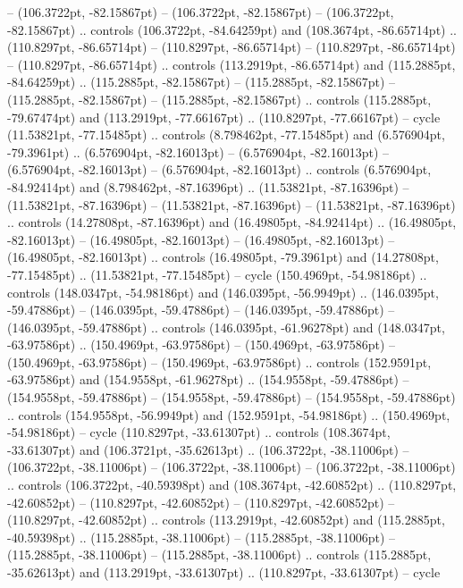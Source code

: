  -- (106.3722pt, -82.15867pt)
 -- (106.3722pt, -82.15867pt)
 -- (106.3722pt, -82.15867pt) .. controls (106.3722pt, -84.64259pt) and (108.3674pt, -86.65714pt) .. (110.8297pt, -86.65714pt)
 -- (110.8297pt, -86.65714pt)
 -- (110.8297pt, -86.65714pt)
 -- (110.8297pt, -86.65714pt) .. controls (113.2919pt, -86.65714pt) and (115.2885pt, -84.64259pt) .. (115.2885pt, -82.15867pt)
 -- (115.2885pt, -82.15867pt)
 -- (115.2885pt, -82.15867pt)
 -- (115.2885pt, -82.15867pt) .. controls (115.2885pt, -79.67474pt) and (113.2919pt, -77.66167pt) .. (110.8297pt, -77.66167pt) -- cycle
(11.53821pt, -77.15485pt) .. controls (8.798462pt, -77.15485pt) and (6.576904pt, -79.3961pt) .. (6.576904pt, -82.16013pt)
 -- (6.576904pt, -82.16013pt)
 -- (6.576904pt, -82.16013pt)
 -- (6.576904pt, -82.16013pt) .. controls (6.576904pt, -84.92414pt) and (8.798462pt, -87.16396pt) .. (11.53821pt, -87.16396pt)
 -- (11.53821pt, -87.16396pt)
 -- (11.53821pt, -87.16396pt)
 -- (11.53821pt, -87.16396pt) .. controls (14.27808pt, -87.16396pt) and (16.49805pt, -84.92414pt) .. (16.49805pt, -82.16013pt)
 -- (16.49805pt, -82.16013pt)
 -- (16.49805pt, -82.16013pt)
 -- (16.49805pt, -82.16013pt) .. controls (16.49805pt, -79.3961pt) and (14.27808pt, -77.15485pt) .. (11.53821pt, -77.15485pt) -- cycle
(150.4969pt, -54.98186pt) .. controls (148.0347pt, -54.98186pt) and (146.0395pt, -56.9949pt) .. (146.0395pt, -59.47886pt)
 -- (146.0395pt, -59.47886pt)
 -- (146.0395pt, -59.47886pt)
 -- (146.0395pt, -59.47886pt) .. controls (146.0395pt, -61.96278pt) and (148.0347pt, -63.97586pt) .. (150.4969pt, -63.97586pt)
 -- (150.4969pt, -63.97586pt)
 -- (150.4969pt, -63.97586pt)
 -- (150.4969pt, -63.97586pt) .. controls (152.9591pt, -63.97586pt) and (154.9558pt, -61.96278pt) .. (154.9558pt, -59.47886pt)
 -- (154.9558pt, -59.47886pt)
 -- (154.9558pt, -59.47886pt)
 -- (154.9558pt, -59.47886pt) .. controls (154.9558pt, -56.9949pt) and (152.9591pt, -54.98186pt) .. (150.4969pt, -54.98186pt) -- cycle
(110.8297pt, -33.61307pt) .. controls (108.3674pt, -33.61307pt) and (106.3721pt, -35.62613pt) .. (106.3722pt, -38.11006pt)
 -- (106.3722pt, -38.11006pt)
 -- (106.3722pt, -38.11006pt)
 -- (106.3722pt, -38.11006pt) .. controls (106.3722pt, -40.59398pt) and (108.3674pt, -42.60852pt) .. (110.8297pt, -42.60852pt)
 -- (110.8297pt, -42.60852pt)
 -- (110.8297pt, -42.60852pt)
 -- (110.8297pt, -42.60852pt) .. controls (113.2919pt, -42.60852pt) and (115.2885pt, -40.59398pt) .. (115.2885pt, -38.11006pt)
 -- (115.2885pt, -38.11006pt)
 -- (115.2885pt, -38.11006pt)
 -- (115.2885pt, -38.11006pt) .. controls (115.2885pt, -35.62613pt) and (113.2919pt, -33.61307pt) .. (110.8297pt, -33.61307pt) -- cycle
